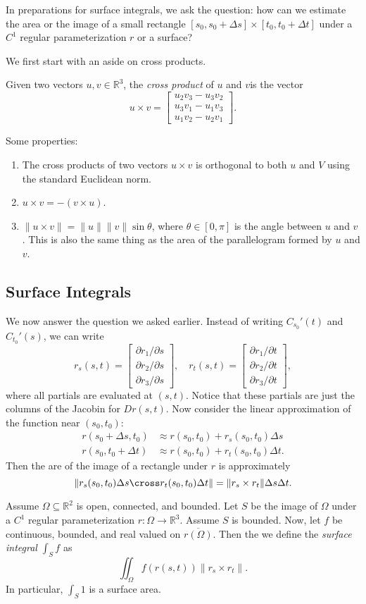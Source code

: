 \documentclass[11pt]{article}
\theoremstyle{definition}
\newcommand{\R}{\mathbb{R}}                      %
\newcommand{\mat}{\begin{bmatrix}}
\newcommand{\trix}{\end{bmatrix}}
\newcommand{\dell}{\partial}
\begin{document}
In preparations for surface integrals, we ask the question: how can we estimate the area or the image of a small rectangle $[s_0,s_0+\Delta s]\times [t_0, t_0 + \Delta t]$ under a $C^1$ regular parameterization $r$ or a surface?

We first start with an aside on cross products.
\begin{mdframed}[backgroundcolor = blue!10]
\vspace{+0.1cm}
 Given two vectors $u,v\in\R^3$, the \textit{cross product} of $u$ and $v$is the vector
$$
u\times v = \mat u_2v_3 - u_3v_2\\  u_3v_1 - u_1v_3 \\ u_1v_2 - u_2v_1 \trix.
$$
\end{mdframed}
Some properties:
\begin{enumerate}
    \item The cross products of two vectors $u\times v$ is orthogonal to both $u$ and $V$ using the standard Euclidean norm.
    \item $u\times v = -(v\times u)$.
    \item $\|u\times v\| = \|u\| \|v\|\sin\theta$, where $\theta\in [0,\pi]$ is the angle between $u$ and $v$. This is also the same thing as the area of the parallelogram formed by $u$ and $v$.
\end{enumerate}

\subsection{Surface Integrals}
We now answer the question we asked earlier. Instead of writing $C_{s_0}' (t)$ and $C_{t_0}'(s)$, we can write
$$
r_s(s,t) = \mat \dell r_1 / \dell s \\ \dell r_2 / \dell s \\ \dell r_3 / \dell s\trix ,\quad 
r_t(s,t) = \mat \dell r_1 / \dell t \\ \dell r_2 / \dell t \\ \dell r_3 / \dell t\trix ,
$$
where all partials are evaluated at $(s,t)$. Notice that these partials are just the columns of the Jacobin for $Dr(s,t)$. Now consider the linear approximation of the function near $(s_0,t_0)$:
\begin{align*}
    r(s_0+\Delta s ,t_0)&\approx r(s_0,t_0) + r_s(s_0,t_0)\Delta s\\
    r(s_0 ,t_0+\Delta t)&\approx r(s_0,t_0) + r_t(s_0,t_0)\Delta t.
\end{align*}
Then the are of the image of a rectangle under $r$ is approximately
$$
\|r_s(s_0,t_0)\Delta s \cross r_t(s_0,t_0)\Delta t \| = \|r_s\times r_t\|\Delta s \Delta t.
$$

\begin{mdframed}[backgroundcolor = blue!10]
\vspace{+0.1cm}
 Assume $\Omega\subseteq \R^2$ is open, connected, and bounded. Let $S$ be the image of $\Omega$ under a $C^1$ regular parameterization $r:\Omega\to \R^3$. Assume $S$ is bounded. Now, let $f$ be continuous, bounded, and real valued on $\overline{ r(\Omega)}$. Then the we define the \textit{surface integral} $\int_S f$ as
$$
\iint_\Omega f(r(s,t)) \|r_s\times r_t\|.
$$
In particular, $\int_S 1$ is a surface area.
\end{mdframed}
\end{document}
